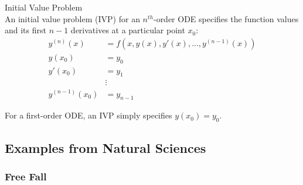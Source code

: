 \begin{definition}{Initial Value Problem}\\
An initial value problem (IVP) for an $n^{th}$-order ODE specifies the function values and its first $n-1$ derivatives at a particular point $x_0$:
\begin{align*}
y^{(n)}(x) &= f(x, y(x), y'(x), ..., y^{(n-1)}(x))\\
y(x_0) &= y_0\\
y'(x_0) &= y_1\\
&\vdots\\
y^{(n-1)}(x_0) &= y_{n-1}
\end{align*}

For a first-order ODE, an IVP simply specifies $y(x_0) = y_0$.
\end{definition}

\subsection{Examples from Natural Sciences}

\subsubsection{Free Fall}

